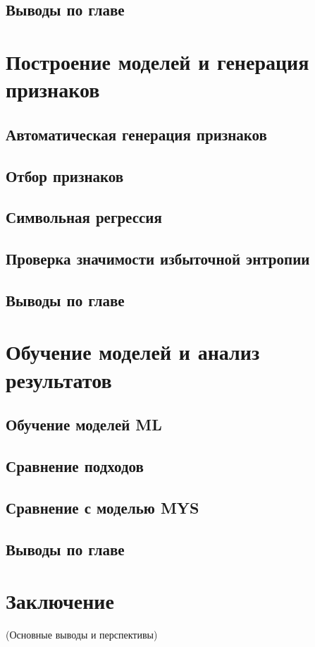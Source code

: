 \documentclass[a4paper,12pt]{article}
\begin{document}
  \subsection{Выводы по главе}
\newpage

\section{Построение моделей и генерация признаков}
  \subsection{Автоматическая генерация признаков}
  \subsection{Отбор признаков}
  \subsection{Символьная регрессия}
  \subsection{Проверка значимости избыточной энтропии}
  \subsection{Выводы по главе}
\newpage

\section{Обучение моделей и анализ результатов}
  \subsection{Обучение моделей ML}
  \subsection{Сравнение подходов}
  \subsection{Сравнение с моделью MYS}
  \subsection{Выводы по главе}
\newpage

\section*{Заключение}
(Основные выводы и перспективы)
\newpage
\end{document}
